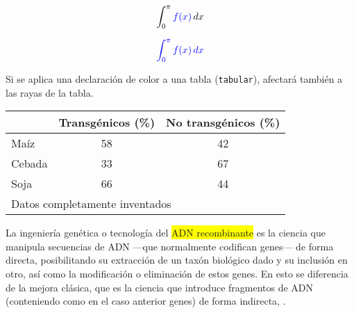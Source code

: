 \documentclass[11pt,twoside]{article}
\begin{document}
\begin{equation*}
\int_0^\pi {\color{blue}f(x)} \, dx
\end{equation*}


 
\begin{equation*}
\color{blue}
\int_0^\pi f(x) \, dx
\end{equation*}





\bigskip
Si se aplica una declaración de color a una tabla (\texttt{tabular}), afectará también a las rayas de la tabla.
\begin{center}
\color{Blue}
\begin{tabular}{|l|c|c|}

\hline
     &  Transgénicos (\%)  & No transgénicos (\%)  \\
\hline\hline
Maíz  &    58  &   42 \\
\hline
Cebada &   33   &  67   \\
\hline
Soja   &  66   & 44 \\
\hline
\multicolumn{3}{l}{\footnotesize Datos completamente inventados}
\end{tabular}
\end{center}





\bigskip
La ingeniería genética o tecnología del
\colorbox{yellow}{ADN recombinante}
es la ciencia que manipula secuencias de ADN ---que normalmente codifican genes--- de forma directa, posibilitando su extracción de un taxón biológico dado y su inclusión en otro, así como la modificación o eliminación de estos genes. En esto se diferencia de la mejora clásica, que es la ciencia que introduce fragmentos de ADN (conteniendo como en el caso anterior genes) de forma indirecta,
.
\end{document}
